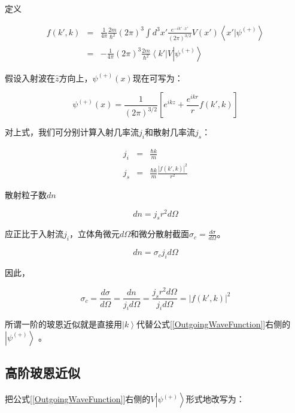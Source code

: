定义

\begin{eqnarray*}
f(k',k) & = & \frac{1}{4 \pi} \frac{2m}{\hbar^2} (2\pi)^3 \int d^3 x' \frac{e^{-i k' \cdot x'}}{(2 \pi)^{3/2}} V(x') \left\langle x' | \psi^{(+)} \right\rangle \\
{} & = & - \frac{1}{4\pi}(2 \pi)^3 \frac{2m}{ \hbar^2 } \left\langle k' \right| V \left| \psi^{(+)} \right\rangle
\end{eqnarray*}

假设入射波在$\hat z$方向上，$\psi^{(+)} (x)$现在可写为：

\begin{equation}
\psi^{(+)} (x) = \frac{1}{(2 \pi)^{3/2}} \left[ e^{i k z} + \frac{e^{ikr}}{r} f(k', k)  \right]
\end{equation}

对上式，我们可分别计算入射几率流$j_i$和散射几率流$j_s$：

\begin{eqnarray}
j_i & = & \frac{\hbar k}{m} \\
j_s & = & \frac{\hbar k}{m} \frac{|f(k', k)|^2}{r^2}
\end{eqnarray}

散射粒子数$dn$

\begin{equation}
d n = j_s r^2 d \Omega
\end{equation}

应正比于入射流$j_i$，立体角微元$d \Omega$和微分散射截面$\sigma_c = \frac{d \sigma}{d \Omega}$。

\begin{equation}
d n = \sigma_c j_i d \Omega
\end{equation}

因此，

\begin{equation}
\sigma_c = \frac{d \sigma}{d \Omega} = \frac{d n}{ j_i d \Omega  }=\frac{ j_s r^2 d \Omega }{j_i d \Omega} = |f(k',k)|^2
\end{equation}

所谓一阶的玻恩近似就是直接用$\left| k \right\rangle$代替公式[\ref{OutgoingWaveFunction}]右侧的$\left| \psi^{(+)} \right\rangle$ 。

\subsection{高阶玻恩近似}

把公式[\ref{OutgoingWaveFunction}]右侧的$V \left| \psi^{(+)} \right\rangle$形式地改写为：

